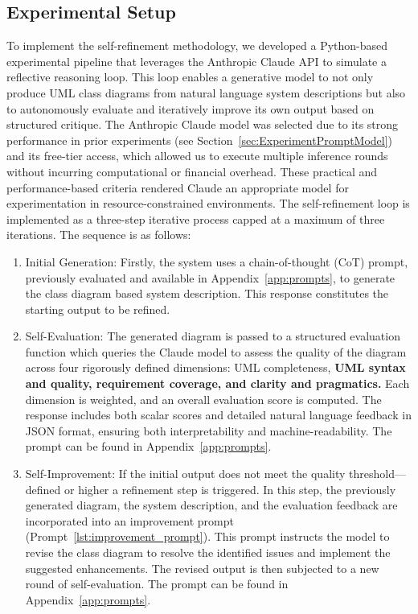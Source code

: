 \subsection{Experimental Setup}
To implement the self-refinement methodology, we developed a Python-based experimental pipeline that leverages the Anthropic Claude API to simulate a reflective reasoning loop. This loop enables a generative model to not only produce UML class diagrams from natural language system descriptions but also to autonomously evaluate and iteratively improve its own output based on structured critique.
The Anthropic Claude model was selected due to its strong performance in prior experiments (see Section~\ref{sec:ExperimentPromptModel}) and its free-tier access, which allowed us to execute multiple inference rounds without incurring computational or financial overhead. These practical and performance-based criteria rendered Claude an appropriate model for experimentation in resource-constrained environments.
The self-refinement loop is implemented as a three-step iterative process capped at a maximum of three iterations. The sequence is as follows:

\begin{enumerate}
    \item Initial Generation: Firstly, the system uses a chain-of-thought (CoT) prompt, previously evaluated and available in Appendix~\ref{app:prompts}, to generate the class diagram based system description. This response constitutes the starting output to be refined.

    \item Self-Evaluation: The generated diagram is passed to a structured evaluation function which queries the Claude model to assess the quality of the diagram across four rigorously defined dimensions: UML completeness, \textbf{UML syntax and quality, requirement coverage, and clarity and pragmatics.} 
    Each dimension is weighted, and an overall evaluation score is computed. 
    The response includes both scalar scores and detailed natural language feedback in JSON format, ensuring both interpretability and machine-readability. The prompt can be found in Appendix~\ref{app:prompts}.

    \item Self-Improvement: If the initial output does not meet the quality threshold—defined or higher a refinement step is triggered. In this step, the previously generated diagram, the system description, and the evaluation feedback are incorporated into an improvement prompt (Prompt~\ref{lst:improvement_prompt}). This prompt instructs the model to revise the class diagram to resolve the identified issues and implement the suggested enhancements. The revised output is then subjected to a new round of self-evaluation.  The prompt can be found in Appendix~\ref{app:prompts}.

\end{enumerate}



